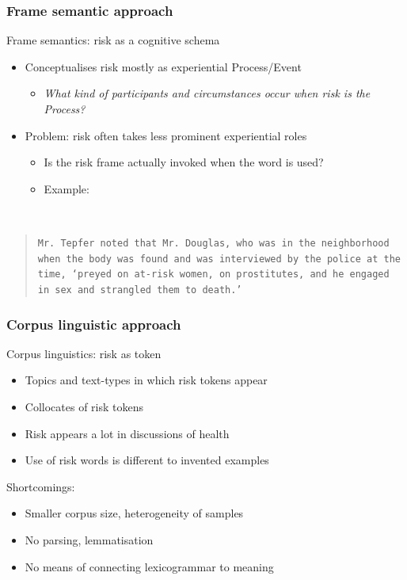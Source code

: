 \documentclass{beamer}       %
\begin{document}

\begin{frame}
    \frametitle{Frame semantic approach}

    Frame semantics: risk as a cognitive schema \cite{fillmore_toward_1992}

\begin{itemize}
    \item Conceptualises risk mostly as experiential Process\slash Event
    \begin{itemize}
        \item \emph{What kind of participants and circumstances occur when risk is the Process?}
    \end{itemize}
    \item Problem: risk often takes less prominent experiential roles
    \begin{itemize}
        \item Is the risk frame actually invoked when the word is used?
        \item Example:
    \end{itemize}
    \end{itemize}

    ~\\
    \footnotesize
    \begin{quote}
    \noindent
    \texttt{Mr. Tepfer noted that Mr. Douglas, who was in the neighborhood when the body was found and was interviewed by the police at the time, `preyed on \textbf{at-risk women}, on prostitutes, and he engaged in sex and strangled them to death.' }
    \end{quote}

\end{frame}

\begin{frame}
    \frametitle{Corpus linguistic approach}

    Corpus linguistics: risk as token \cite{hamilton_meanings_2007}

    \begin{itemize}
    \item Topics and text-types in which risk tokens appear
    \item Collocates of risk tokens \cite{hamilton_meanings_2007}
    \item Risk appears a lot in discussions of health
    \item Use of risk words is different to invented examples
    \end{itemize}

    Shortcomings:

    \begin{itemize}
        \item Smaller corpus size, heterogeneity of samples
        \item No parsing, lemmatisation
        \item No means of connecting lexicogrammar to meaning
    \end{itemize}

\end{frame}
\end{document}
